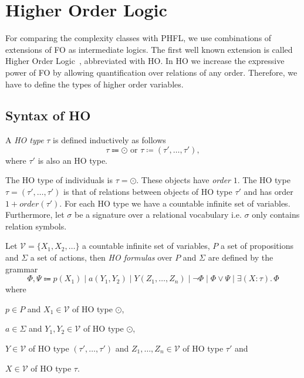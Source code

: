 

\section{Higher Order Logic}\label{sec:higherOrderLogic}

For comparing the complexity classes with PHFL, we use combinations of extensions of FO as intermediate logics. The first well
known extension is called Higher Order Logic~\cite{vanBenthem2001higher}, abbreviated with HO. In HO we
increase the expressive power of FO by allowing quantification over relations of any order. Therefore, we have to define the
types of higher order variables.

\subsection{Syntax of HO}\label{subsec:hoSyntax}

\begin{definition}
    A \emph{HO type} $\tau$ is defined inductively as follows
    \[ \tau \Coloneqq \odot \text{ or } \tau \coloneqq (\tau', \dots, \tau'), \]
    where $\tau'$ is also an HO type.
\end{definition}

The HO type of individuals is $\tau = \odot$. These objects have \textit{order} $1$. The HO type $\tau = (\tau',
\dots, \tau')$ is that of relations between objects of HO type $\tau'$ and has order $1 + order(\tau')$. For
each HO type we have a countable infinite set of variables. Furthermore, let $\sigma$ be a signature over a
relational vocabulary i.e. $\sigma$ only contains relation symbols.

\begin{definition}
    Let $\mathcal{V} = \{X_1, X_2, \dots \}$ a countable infinite set of variables, $P$ a set of propositions and $\Sigma$ a set of actions, then \emph{HO
    formulas} over $P$ and $\Sigma$ are defined by the grammar
    \[\Phi, \Psi \Coloneqq p(X_1) \mid a(Y_1, Y_2) \mid Y(Z_1, \dots, Z_n) \mid \neg \Phi \mid \Phi \vee \Psi \mid \exists
    (X \colon \tau).\,\Phi\]
    where
    \begin{compactitem}
        \item $p \in P$ and $X_1 \in \mathcal{V}$ of HO type $\odot$,
        \item $a \in \Sigma$ and $Y_1, Y_2 \in \mathcal{V}$ of HO type $\odot$,
        \item $Y \in \mathcal{V}$ of HO type $(\tau', \dots, \tau')$ and $Z_1, \dots, Z_n \in \mathcal{V}$ of HO type $\tau'$ and
        \item $X \in \mathcal{V}$ of HO type $\tau$.
    \end{compactitem}
\end{definition}

